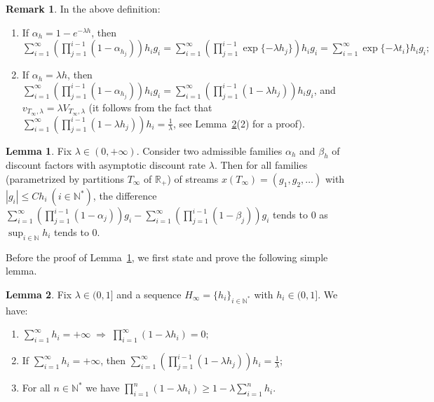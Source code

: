 \documentclass[english,openary,12pt]{article}
\theoremstyle{definition}
\newtheorem{remark}{Remark}
\newtheorem{lemma}{Lemma}
\newcommand{\R}{\mathbb{R}}
\newcommand{\N}{\mathbb{N}}
\begin{document}
\begin{remark}
	\label{stth3}
	In the above definition:
	\begin{enumerate}
		\item If $\alpha_h = 1 - e^{-\lambda h}$, then
		$\sum\limits_{i = 1}^\infty \left(\prod\limits_{j = 1}^{i-1} 
		(1-\alpha_{h_j}) \right) h_i g_i = 
		\sum\limits_{i = 1}^\infty \left(\prod\limits_{j = 1}^{i-1} 
		\exp\{-\lambda h_j\} \right) h_i g_i = \sum\limits_{i = 1}^\infty 
		\exp\{-\lambda t_i\} h_i g_i;$
		\item If $\alpha_h = \lambda h$, then
		$\sum\limits_{i = 1}^\infty \left(\prod\limits_{j = 1}^{i-1} 
		(1-\alpha_{h_j}) \right) h_i g_i = 
		\sum\limits_{i = 1}^\infty \left(\prod\limits_{j = 1}^{i-1} 
		(1-\lambda h_j) \right) h_i g_i$, and 
		$v_{T_\infty,\lambda} = \lambda V_{T_\infty,\lambda}$ 
		(it follows from the fact that
		$\sum\limits_{i = 1}^\infty \left(\prod\limits_{j = 1}^{i-1} 
		(1-\lambda h_j) \right) h_i = \frac{1}{\lambda}$,
		see Lemma~\ref{lem1}(2) for a proof).
	\end{enumerate}
\end{remark}

\begin{lemma}
\label{admissible2}
	Fix $\lambda \in (0, +\infty)$. Consider two admissible families $\alpha_h$ 
	and $\beta_h$ of discount factors with asymptotic discount rate $\lambda$. 
	Then for all families (parametrized by partitions $T_\infty$ of $\R_+$) of 
	streams $x (T_\infty) = (g_1, g_2, \ldots)$ with 
	$|g_i| \le C h_i \: (i \in \N^*)$, the difference 
	$\sum\limits_{i = 1}^\infty \left(\prod\limits_{j = 1}^{i-1} 
	(1-\alpha_j) \right) g_i - \sum\limits_{i = 1}^\infty 
	\left(\prod\limits_{j = 1}^{i-1} (1-\beta_j) \right) g_i$
	tends to $0$ as $\sup\nolimits_{i\in\N} h_i$ tends to $0$.
\end{lemma}

Before the proof of Lemma~\ref{admissible2}, we first state and prove 
the following simple lemma.

\begin{lemma}
  \label{lem1}
  Fix $\lambda \in (0, 1]$ and a sequence 
  $H_\infty = \{h_i\}_{i\in\N^*}$ with $h_i \in (0,1]$. We have:
  \begin{enumerate}
    \item $\sum\limits_{i = 1}^\infty h_i = +\infty 
    \;\Rightarrow\; \prod\limits_{i = 1}^\infty (1 - \lambda h_i) = 0;$
    \item If $\sum\limits_{i = 1}^\infty h_i = +\infty$, then 
    $\sum\limits_{i = 1}^\infty \left(\prod\limits_{j = 1}^{i-1} 
    (1 - \lambda h_j)\right) h_i = \frac{1}{\lambda}$;
    \item For all $n \in \N^*$ we have $\prod\limits_{i = 1}^n 
    (1 - \lambda h_i) \ge 1- \lambda \sum\limits_{i=1}^n h_i$.
  \end{enumerate}
\end{lemma}
  
\end{document}
